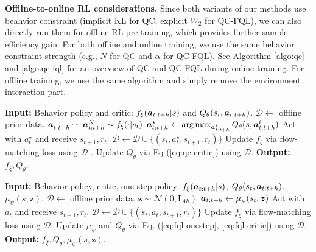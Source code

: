 \textbf{Offline-to-online RL considerations.} Since both variants of our methods use beahvior constraint (implicit KL for QC, explicit $W_2$ for QC-FQL), we can also directly run them for offline RL pre-training, which provides further sample efficiency gain. For both offline and online training, we use the same behavior constraint strength (e.g., $N$ for QC and $\alpha$ for QC-FQL). See Algorithm \ref{algo:qc} and \ref{algo:qc-fql} for an overview of QC and QC-FQL during online training. For offline training, we use the same algorithm and simply remove the environment interaction part.





\begin{minipage}{0.48\textwidth}
\begin{algorithm}[H]
\caption{{\color{ourpurple}$\mathtt{QC}$}}
\label{algo:qc}
\begin{algorithmic}

\small
\State \textbf{Input:} Behavior policy and critic: $f_\xi(\boldsymbol{a}_{t:t+h} | s)$ and $Q_\theta(s_t, \boldsymbol{a}_{t:t+h})$.
\State $\mathcal{D} \leftarrow$ offline prior data.
        \State $\boldsymbol{a}_{t:t+h}^1 \cdots \boldsymbol{a}_{t:t+h}^N \sim f_\xi(\cdot | s_t)$
        \State $\boldsymbol{a}_{t:t+h}^\star \leftarrow \arg\max_{\boldsymbol{a}_{t:t+h}^i} Q_\theta(s, \boldsymbol{a}_{t:t+h}^i)$
    \EndIf
    \State Act with $a^\star_t$ and receive $s_{t+1}, r_t$.
    \State $\mathcal{D} \leftarrow \mathcal{D} \cup \{(s_t, a^\star_t, s_{t+1}, r_t)\}$
    \State Update $f_\xi$ via flow-matching loss using $\mathcal{D}$ .
    \State Update $Q_\theta$ via Eq (\ref{eq:qc-critic}) using $\mathcal{D}$.
\EndFor
\State \textbf{Output:} $f_\xi, Q_\theta$.
\end{algorithmic}
\end{algorithm}
\end{minipage}
\hfill
\begin{minipage}{0.48\textwidth}
\begin{algorithm}[H]
\caption{{\color{ourpurple}$\mathtt{QC}$-$\mathtt{FQL}$}}
\label{algo:qc-fql}
\begin{algorithmic}
\small
\State \textbf{Input:} Behavior policy, critic, one-step policy: $f_\xi(\boldsymbol{a}_{t:t+h} | s)$, $Q_\theta(s_t, \boldsymbol{a}_{t:t+h})$, $\mu_\psi(s, \mathbf z)$.
\State $\mathcal{D} \leftarrow$ offline prior data.
        \State $\mathbf z \sim \mathcal{N}(0, \mathbf I_{Ah})$
        \State $\boldsymbol{a}_{t:t+h} \leftarrow \mu_\psi(s_t, \boldsymbol z)$
    \EndIf
    \State Act with $a_t$ and receive $s_{t+1}, r_t$.
    \State $\mathcal{D} \leftarrow \mathcal{D} \cup \{(s_t, a_t, s_{t+1}, r_t)\}$
    \State Update $f_\xi$ via flow-matching loss using $\mathcal{D}$.
    \State Update $\mu_{\psi}$ and $Q_\theta$ via Eq. (\ref{eq:fql-onestep}, \ref{eq:fql-critic}) using $\mathcal{D}$.
\EndFor
\State \textbf{Output:} $f_\xi, Q_\theta, \mu_\psi(s, \mathbf z)$.
\end{algorithmic}
\end{algorithm}
\end{minipage}

